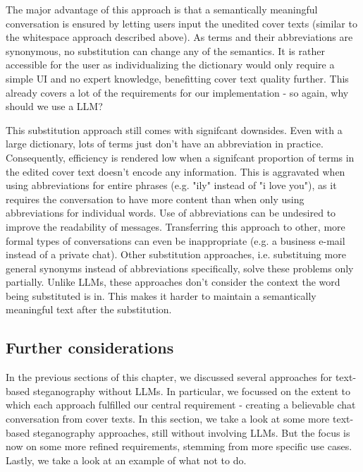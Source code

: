 The major advantage of this approach is that a semantically meaningful conversation is ensured by letting users input the unedited cover texts (similar to the whitespace approach described above). As terms and their abbreviations are synonymous, no substitution can change any of the semantics. It is rather accessible for the user as individualizing the dictionary would only require a simple \gls{UI} and no expert knowledge, benefitting cover text quality further. This already covers a lot of the requirements for our implementation - so again, why should we use a \gls{LLM}?

This substitution approach still comes with signifcant downsides. Even with a large dictionary, lots of terms just don't have an abbreviation in practice. Consequently, efficiency is rendered low when a signifcant proportion of terms in the edited cover text doesn't encode any information. This is aggravated when using abbreviations for entire phrases (e.g. "ily" instead of "i love you"), as it requires the conversation to have more content than when only using abbreviations for individual words. Use of abbreviations can be undesired to improve the readability of messages. Transferring this approach to other, more formal types of conversations can even be inappropriate (e.g. a business e-mail instead of a private chat). Other substitution approaches, i.e. substituing more general synonyms instead of abbreviations specifically, solve these problems only partially. Unlike \glspl{LLM}, these approaches don't consider the context the word being substituted is in. This makes it harder to maintain a semantically meaningful text after the substitution.

\subsection{Further considerations}
\label{sec:furtherConsiderations}
In the previous sections of this chapter, we discussed several approaches for text-based steganography without \glspl{LLM}. In particular, we focussed on the extent to which each approach fulfilled our central requirement - creating a believable chat conversation from cover texts. In this section, we take a look at some more text-based steganography approaches, still without involving \glspl{LLM}. But the focus is now on some more refined requirements, stemming from more specific use cases. Lastly, we take a look at an example of what not to do.

